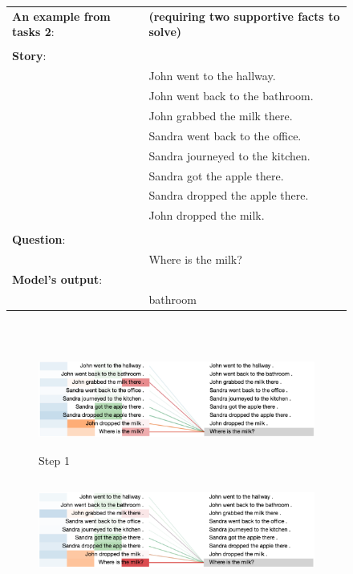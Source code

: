 \begin{figure}[!h]
\label{fig:ex3}
\begin{minipage}{\textwidth}
\fontsize{8}{8}\selectfont
\begin{tabular}{l l}
\textbf{An example from tasks 2}: & \textbf{(requiring two supportive facts to solve)}\\
\\
\textbf{Story}: & \\
& John went to the hallway. \\
& John went back to the bathroom. \\
& John grabbed the milk there. \\
& Sandra went back to the office. \\
& Sandra journeyed to the kitchen. \\
& Sandra got the apple there. \\
& Sandra dropped the apple there. \\
& John dropped the milk. \\
\\
\textbf{Question}: & \\
& Where is the milk? \\
\textbf{Model's output}: & \\
& bathroom
\end{tabular}
\end{minipage}
\\ \vfill
\vspace{20pt} %
\begin{minipage}{\textwidth}
    \centering
    \begin{subfigure}[t]{\textwidth}
        \centering
        \includegraphics[height=1.3in]{04-part-03/chapter-06/figs_and_tables/figs_attention_babi/e3-step1}
        \caption{Step 1}
    \end{subfigure}%
    \hfill \hfill
    \begin{subfigure}[t]{\textwidth}
        \centering
        \includegraphics[height=1.3in]{04-part-03/chapter-06/figs_and_tables/figs_attention_babi/e3-step2}

\end{subfigure}
\end{minipage}
\end{figure}
